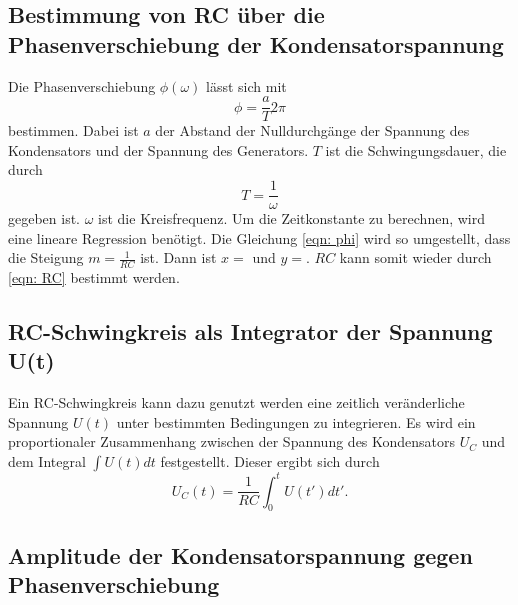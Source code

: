 \subsection{Bestimmung von RC über die Phasenverschiebung der Kondensatorspannung}
Die Phasenverschiebung $\phi(\omega)$ lässt sich mit
\begin{equation}
    \phi = \frac{a}{T}2\pi
\end{equation}
bestimmen. Dabei ist $a$ der Abstand der Nulldurchgänge der Spannung des Kondensators und der Spannung des Generators.
$T$ ist die Schwingungsdauer, die durch
\begin{equation}
    T = \frac{1}{\omega}
\end{equation}
gegeben ist. $\omega$ ist die Kreisfrequenz.
Um die Zeitkonstante zu berechnen, wird eine lineare Regression benötigt.
Die Gleichung \eqref{eqn: phi} wird so umgestellt, dass die Steigung $m = \frac{1}{RC}$ ist.
Dann ist $x= $ und $y= $. %
$RC$ kann somit wieder durch \eqref{eqn: RC} bestimmt werden.

\subsection{RC-Schwingkreis als Integrator der Spannung U(t)}
Ein RC-Schwingkreis kann dazu genutzt werden eine zeitlich veränderliche Spannung $U(t)$ unter bestimmten Bedingungen zu integrieren. 
Es wird ein proportionaler Zusammenhang zwischen der Spannung des Kondensators $U_{C}$ und dem Integral $\int U(t) dt$ festgestellt. Dieser ergibt sich durch 
\begin{equation}
    U_{C}(t) = \frac{1}{RC} \int_{0}^{t} U(t') dt'.
\end{equation}

\subsection{Amplitude der Kondensatorspannung gegen Phasenverschiebung}
